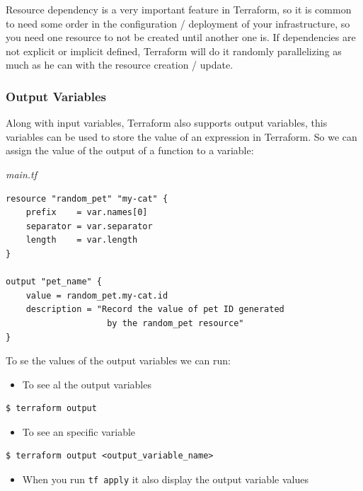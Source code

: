 \documentclass{article}
\newenvironment{codetemplate}[1][]{%
  \mybasecolorbox[#1]
  \itshape
}{%
  \endmybasecolorbox
}
\begin{document}
Resource dependency is a very important feature in Terraform, so it is common to need some order in the configuration / deployment of your infrastructure, so you need one resource to not be created until another one is. If dependencies are not explicit or implicit defined, Terraform will do it randomly parallelizing as much as he can with the resource creation / update.

\subsubsection{Output Variables}
Along with input variables, Terraform also supports output variables, this variables can be used to store the value of an expression in Terraform. So we can assign the value of the output of a function to a variable:

\begin{codetemplate}{main.tf}
\begin{verbatim}
resource "random_pet" "my-cat" {
    prefix    = var.names[0]
    separator = var.separator
    length    = var.length
}

output "pet_name" {
    value = random_pet.my-cat.id
    description = "Record the value of pet ID generated 
                    by the random_pet resource"
}
\end{verbatim}
\end{codetemplate}

To se the values of the output variables we can run:
\begin{itemize}
    \item To see al the output variables
\end{itemize}
\begin{codetemplate}{}
\begin{verbatim}
$ terraform output
\end{verbatim}
\end{codetemplate}
\begin{itemize}
    \item To see an specific variable
\end{itemize}
\begin{codetemplate}{}
\begin{verbatim}
$ terraform output <output_variable_name>
\end{verbatim}
\end{codetemplate}
\begin{itemize}
    \item When you run \verb+tf apply+ it also display the output variable values
\end{itemize}
\end{document}
